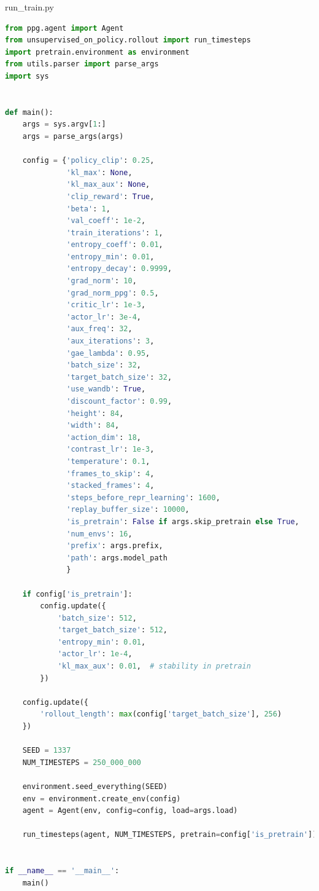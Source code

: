 \documentclass{article}
\begin{document}
run\_train.py
\begin{lstlisting}[language=Python]
from ppg.agent import Agent
from unsupervised_on_policy.rollout import run_timesteps
import pretrain.environment as environment
from utils.parser import parse_args
import sys


def main():
    args = sys.argv[1:]
    args = parse_args(args)

    config = {'policy_clip': 0.25,
              'kl_max': None,
              'kl_max_aux': None,
              'clip_reward': True,
              'beta': 1,
              'val_coeff': 1e-2,
              'train_iterations': 1,
              'entropy_coeff': 0.01,
              'entropy_min': 0.01,
              'entropy_decay': 0.9999,
              'grad_norm': 10,
              'grad_norm_ppg': 0.5,
              'critic_lr': 1e-3,
              'actor_lr': 3e-4,
              'aux_freq': 32,
              'aux_iterations': 3,
              'gae_lambda': 0.95,
              'batch_size': 32,
              'target_batch_size': 32,
              'use_wandb': True,
              'discount_factor': 0.99,
              'height': 84,
              'width': 84,
              'action_dim': 18,
              'contrast_lr': 1e-3,
              'temperature': 0.1,
              'frames_to_skip': 4,
              'stacked_frames': 4,
              'steps_before_repr_learning': 1600,
              'replay_buffer_size': 10000,
              'is_pretrain': False if args.skip_pretrain else True,
              'num_envs': 16,
              'prefix': args.prefix,
              'path': args.model_path
              }

    if config['is_pretrain']:
        config.update({
            'batch_size': 512,
            'target_batch_size': 512,
            'entropy_min': 0.01,
            'actor_lr': 1e-4,
            'kl_max_aux': 0.01,  # stability in pretrain
        })

    config.update({
        'rollout_length': max(config['target_batch_size'], 256)
    })

    SEED = 1337
    NUM_TIMESTEPS = 250_000_000

    environment.seed_everything(SEED)
    env = environment.create_env(config)
    agent = Agent(env, config=config, load=args.load)

    run_timesteps(agent, NUM_TIMESTEPS, pretrain=config['is_pretrain'])


if __name__ == '__main__':
    main()
\end{lstlisting}
\end{document}
